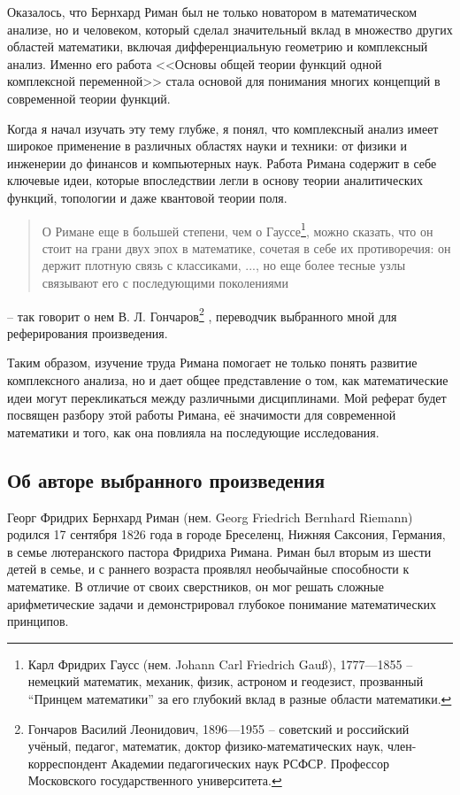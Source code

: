 \documentclass[a4paper,12pt]{article}
\theoremstyle{remark}
\begin{document}
Оказалось, что Бернхард Риман был не только новатором в математическом
анализе, но и человеком, который сделал значительный вклад в множество
других областей математики, включая дифференциальную геометрию и комплексный анализ.
Именно его работа <<Основы общей теории функций одной комплексной
переменной>> \cite{Dissertation} стала основой
для понимания многих концепций в современной теории функций.

Когда я начал изучать эту тему глубже, я понял, что комплексный анализ
имеет широкое применение в различных областях науки и техники:
от физики и инженерии до финансов и компьютерных наук. Работа
Римана содержит в себе ключевые идеи, которые впоследствии легли
в основу теории аналитических функций, топологии и даже квантовой
теории поля.
\begin{quotation}
  О Римане еще в большей степени, чем о Гауссе\footnote{
    Карл Фридрих Гаусс (нем. Johann Carl Friedrich Gauß), 1777—1855 --
    немецкий математик, механик, физик, астроном и геодезист, прозванный ``Принцем математики''
    за его глубокий вклад в разные области математики.
  }, можно сказать,
  что он стоит на грани двух эпох в математике, сочетая в себе их
  противоречия: он держит плотную связь с классиками, ..., но еще
  более тесные узлы связывают его с последующими поколениями
\end{quotation}
-- так говорит о нем В. Л. Гончаров\footnote{
  Гончаров Василий Леонидович, 1896—1955 --
  советский и российский учёный, педагог, математик, доктор физико-математических
  наук, член-корреспондент Академии педагогических наук РСФСР.
  Профессор Московского государственного университета.
} \cite{Essays}, переводчик выбранного мной для реферирования произведения.

Таким образом, изучение труда Римана помогает не только понять
развитие комплексного анализа, но и дает общее представление о том,
как математические идеи могут перекликаться между различными дисциплинами.
Мой реферат будет посвящен разбору этой работы Римана,
её значимости для современной математики и того,
как она повлияла на последующие исследования.

\subsection{Об авторе выбранного произведения}

Георг Фридрих Бернхард Риман (нем. Georg Friedrich Bernhard Riemann) родился
17 сентября 1826 года в городе Бреселенц, Нижняя Саксония,
Германия, в семье лютеранского пастора Фридриха Римана.
Риман был вторым из шести детей в семье, и с раннего возраста
проявлял необычайные способности к математике. В отличие от
своих сверстников, он мог решать сложные арифметические задачи
и демонстрировал глубокое понимание математических принципов.
\end{document}
